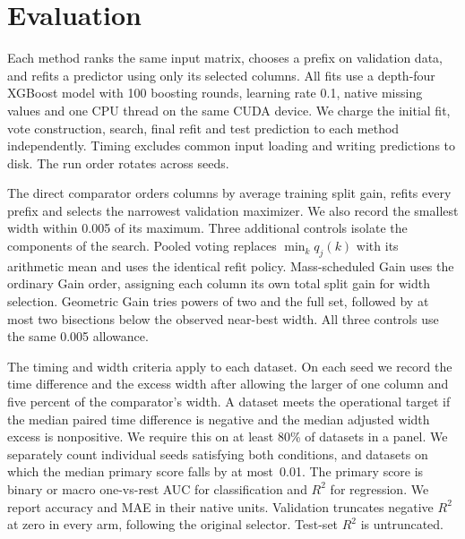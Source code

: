 \section{Evaluation}

Each method ranks the same input matrix, chooses a prefix on validation data, and refits a predictor using only its selected columns. All fits use a depth-four XGBoost model with 100 boosting rounds, learning rate 0.1, native missing values and one CPU thread on the same CUDA device. We charge the initial fit, vote construction, search, final refit and test prediction to each method independently. Timing excludes common input loading and writing predictions to disk. The run order rotates across seeds.

The direct comparator orders columns by average training split gain, refits every prefix and selects the narrowest validation maximizer. We also record the smallest width within 0.005 of its maximum. Three additional controls isolate the components of the search. Pooled voting replaces $\min_k q_j(k)$ with its arithmetic mean and uses the identical refit policy. Mass-scheduled Gain uses the ordinary Gain order, assigning each column its own total split gain for width selection. Geometric Gain tries powers of two and the full set, followed by at most two bisections below the observed near-best width. All three controls use the same 0.005 allowance.

The timing and width criteria apply to each dataset. On each seed we record the time difference and the excess width after allowing the larger of one column and five percent of the comparator's width. A dataset meets the operational target if the median paired time difference is negative and the median adjusted width excess is nonpositive. We require this on at least 80\% of datasets in a panel. We separately count individual seeds satisfying both conditions, and datasets on which the median primary score falls by at most~0.01. The primary score is binary or macro one-vs-rest AUC for classification and $R^2$ for regression. We report accuracy and MAE in their native units. Validation truncates negative $R^2$ at zero in every arm, following the original selector. Test-set $R^2$ is untruncated.

